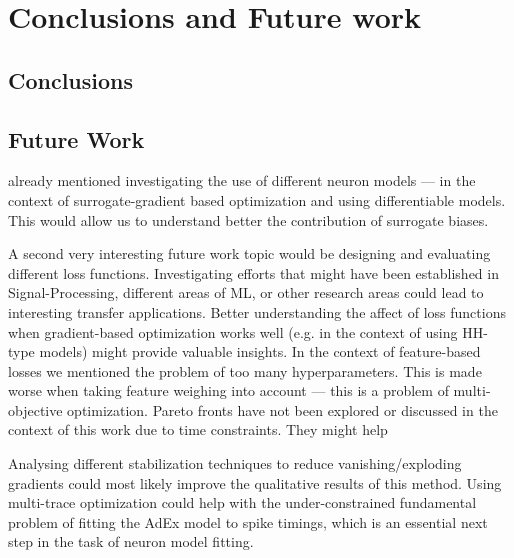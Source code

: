 \chapter{Conclusions and Future work}\label{ch:conclusionsAndFutureWork}


\section{Conclusions}
\label{sec:conclusions}

\section{Future Work}
\label{sec:future-work}

 already mentioned investigating the use of different neuron models
--- in the context of surrogate-gradient based optimization and using differentiable models.
This would allow us to understand better the contribution of surrogate biases.

A second very interesting future work topic would be designing and evaluating different loss functions.
Investigating efforts that might have been established in Signal-Processing, different areas of \gls{ML},
or other research areas could lead to interesting transfer applications.
Better understanding the affect of loss functions when gradient-based optimization works well
(e.g. in the context of using \gls{HH}-type models) might provide valuable insights.
In the context of feature-based losses we mentioned the problem of too many hyperparameters.
This is made worse when taking feature weighing into account --- this is a problem of multi-objective optimization.
Pareto fronts have not been explored or discussed in the context of this work due to time constraints.
They might help 

Analysing different stabilization techniques to reduce vanishing/exploding gradients could 
most likely improve the qualitative results of this method.
Using multi-trace optimization could help with the under-constrained fundamental problem of fitting the AdEx
model to spike timings, which is an essential next step in the task of neuron model fitting.

